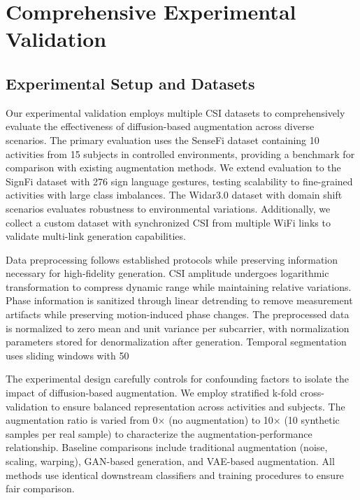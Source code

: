 \documentclass[journal]{IEEEtran}
\begin{document}
\section{Comprehensive Experimental Validation}

\subsection{Experimental Setup and Datasets}

Our experimental validation employs multiple CSI datasets to comprehensively evaluate the effectiveness of diffusion-based augmentation across diverse scenarios. The primary evaluation uses the SenseFi dataset containing 10 activities from 15 subjects in controlled environments, providing a benchmark for comparison with existing augmentation methods. We extend evaluation to the SignFi dataset with 276 sign language gestures, testing scalability to fine-grained activities with large class imbalances. The Widar3.0 dataset with domain shift scenarios evaluates robustness to environmental variations. Additionally, we collect a custom dataset with synchronized CSI from multiple WiFi links to validate multi-link generation capabilities.

Data preprocessing follows established protocols while preserving information necessary for high-fidelity generation. CSI amplitude undergoes logarithmic transformation to compress dynamic range while maintaining relative variations. Phase information is sanitized through linear detrending to remove measurement artifacts while preserving motion-induced phase changes. The preprocessed data is normalized to zero mean and unit variance per subcarrier, with normalization parameters stored for denormalization after generation. Temporal segmentation uses sliding windows with 50%

The experimental design carefully controls for confounding factors to isolate the impact of diffusion-based augmentation. We employ stratified k-fold cross-validation to ensure balanced representation across activities and subjects. The augmentation ratio is varied from 0× (no augmentation) to 10× (10 synthetic samples per real sample) to characterize the augmentation-performance relationship. Baseline comparisons include traditional augmentation (noise, scaling, warping), GAN-based generation, and VAE-based augmentation. All methods use identical downstream classifiers and training procedures to ensure fair comparison.
\end{document}
